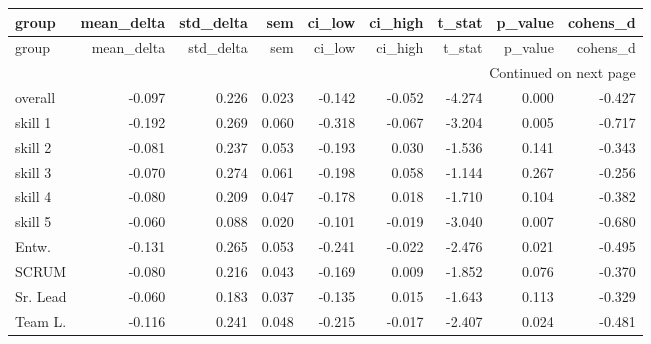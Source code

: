 \begin{longtable}{lrrrrrrrr}
\toprule
group & mean\_delta & std\_delta & sem & ci\_low & ci\_high & t\_stat & p\_value & cohens\_d \\
\midrule
\endfirsthead
\toprule
group & mean\_delta & std\_delta & sem & ci\_low & ci\_high & t\_stat & p\_value & cohens\_d \\
\midrule
\endhead
\midrule
\multicolumn{9}{r}{Continued on next page} \\
\midrule
\endfoot
\bottomrule
\endlastfoot
overall & -0.097 & 0.226 & 0.023 & -0.142 & -0.052 & -4.274 & 0.000 & -0.427 \\
skill 1 & -0.192 & 0.269 & 0.060 & -0.318 & -0.067 & -3.204 & 0.005 & -0.717 \\
skill 2 & -0.081 & 0.237 & 0.053 & -0.193 & 0.030 & -1.536 & 0.141 & -0.343 \\
skill 3 & -0.070 & 0.274 & 0.061 & -0.198 & 0.058 & -1.144 & 0.267 & -0.256 \\
skill 4 & -0.080 & 0.209 & 0.047 & -0.178 & 0.018 & -1.710 & 0.104 & -0.382 \\
skill 5 & -0.060 & 0.088 & 0.020 & -0.101 & -0.019 & -3.040 & 0.007 & -0.680 \\
Entw. & -0.131 & 0.265 & 0.053 & -0.241 & -0.022 & -2.476 & 0.021 & -0.495 \\
SCRUM & -0.080 & 0.216 & 0.043 & -0.169 & 0.009 & -1.852 & 0.076 & -0.370 \\
Sr. Lead & -0.060 & 0.183 & 0.037 & -0.135 & 0.015 & -1.643 & 0.113 & -0.329 \\
Team L. & -0.116 & 0.241 & 0.048 & -0.215 & -0.017 & -2.407 & 0.024 & -0.481 \\
\end{longtable}
